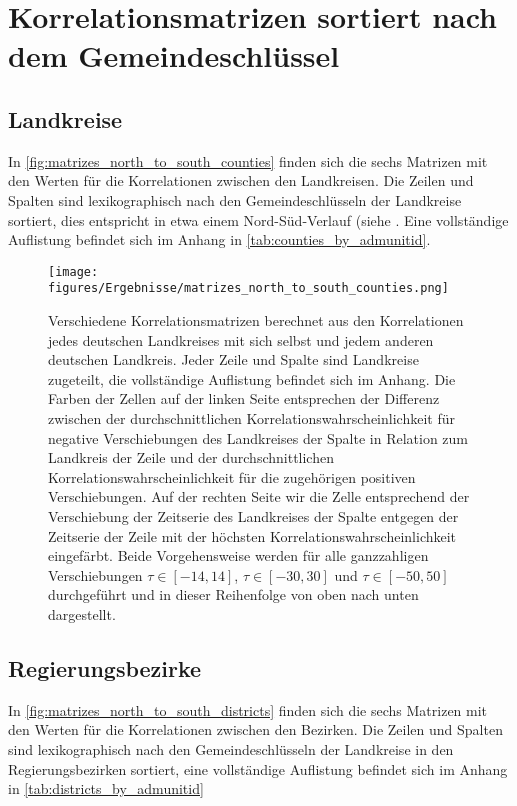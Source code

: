 \section{Korrelationsmatrizen sortiert nach dem Gemeindeschlüssel}
\subsection{Landkreise}
In \autoref{fig:matrizes_north_to_south_counties} finden sich die sechs Matrizen mit den Werten für die Korrelationen zwischen den Landkreisen.
Die Zeilen und Spalten sind lexikographisch nach den Gemeindeschlüsseln der Landkreise sortiert, dies entspricht in etwa einem Nord-Süd-Verlauf (siehe . Eine vollständige Auflistung befindet sich im Anhang in \autoref{tab:counties_by_admunitid}.

\begin{figure}[H]
    \centering
    \texttt{[image: figures/Ergebnisse/matrizes\_north\_to\_south\_counties.png]}
    \caption{Verschiedene Korrelationsmatrizen berechnet aus den Korrelationen jedes deutschen Landkreises mit sich selbst und jedem anderen deutschen Landkreis. Jeder Zeile und Spalte sind Landkreise zugeteilt, die vollständige Auflistung befindet sich im Anhang. Die Farben der Zellen auf der linken Seite entsprechen der Differenz zwischen der durchschnittlichen Korrelationswahrscheinlichkeit für negative Verschiebungen des Landkreises der Spalte in Relation zum Landkreis der Zeile und der durchschnittlichen Korrelationswahrscheinlichkeit für die zugehörigen positiven Verschiebungen.
    Auf der rechten Seite wir die Zelle entsprechend der Verschiebung der Zeitserie des Landkreises der Spalte entgegen der Zeitserie der Zeile mit der höchsten Korrelationswahrscheinlichkeit eingefärbt. Beide Vorgehensweise werden für alle ganzzahligen Verschiebungen $\tau\in[-14,14]$,  $\tau\in[-30,30]$ und  $\tau\in[-50,50]$ durchgeführt und in dieser Reihenfolge von oben nach unten dargestellt.}
    \label{fig:matrizes_north_to_south_counties}
\end{figure}


\subsection{Regierungsbezirke}
In \autoref{fig:matrizes_north_to_south_districts} finden sich die sechs Matrizen mit den Werten für die Korrelationen zwischen den Bezirken. Die Zeilen und Spalten sind lexikographisch nach den Gemeindeschlüsseln der Landkreise in den Regierungsbezirken sortiert, eine vollständige Auflistung befindet sich im Anhang in \autoref{tab:districts_by_admunitid}

